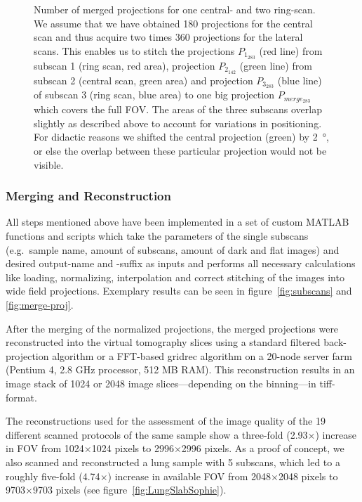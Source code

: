 \begin{figure*}
	\centering
	\caption{Number of merged projections for one central- and two ring-scan. We assume that we have obtained 180 projections for the central scan and thus acquire two times 360 projections for the lateral scans. This enables us to stitch the projections \(P_{1_{283}}\) %
    (red line) from subscan 1 (ring scan, red area), projection \(P_{2_{142}}\) %
    (green line) from subscan 2 (central scan, green area) and projection \(P_{3_{283}}\) %
    (blue line) of subscan 3 (ring scan, blue area) to one big projection \(P_{merge_{283}}\) %
    which covers the full FOV. The areas of the three subscans overlap slightly as described above to account for variations in positioning. For didactic reasons we shifted the central projection (green) by \SI{2}{\degree}, or else the overlap between these particular projection would not be visible.}%
	\label{fig:amount of projections}%
\end{figure*}


\subsubsection{Merging and Reconstruction}
All steps mentioned above have been implemented in a set of custom MATLAB functions and scripts which take the parameters of the single subscans (e.g.\ sample name, amount of subscans, amount of dark and flat images) and desired output-name and -suffix as inputs and performs all necessary calculations like loading, normalizing, interpolation and correct stitching of the images into wide field projections. Exemplary results can be seen in figure~\ref{fig:subscans} and \ref{fig:merge-proj}.

After the merging of the normalized projections, the merged projections were reconstructed into the virtual tomography slices using a standard filtered back-projection algorithm or a FFT-based gridrec algorithm on a 20-node server farm (Pentium 4, 2.8 GHz processor, 512 MB RAM). This reconstruction results in an image stack of 1024 or 2048 image slices---depending on the binning---in tiff-format.

The reconstructions used for the assessment of the image quality of the 19 different scanned protocols of the same sample show a three-fold (2.93\(\times\)) increase in FOV from 1024\(\times\)1024 pixels to 2996\(\times\)2996 pixels. As a proof of concept, we also scanned and reconstructed a lung sample with 5 subscans, which led to a roughly five-fold (4.74\(\times\)) increase in available FOV from 2048\(\times\)2048 pixels to 9703\(\times\)9703 pixels (see figure~\ref{fig:LungSlabSophie}).

